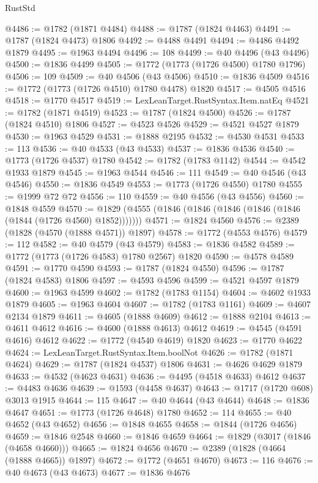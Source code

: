 \begin{lexlean}{RustStd}
\begin{coremodule}
@4486 := @1782 (@1871 @4484)
@4488 := @1787 (@1824 @4463)
@4491 := @1787 (@1824 @4473) @1806
@4492 := @4488 @4491
@4494 := @4486 @4492 @1879
@4495 := @1963 @4494
@4496 := 108
@4499 := @40 @4496 (@43 @4496)
@4500 := @1836 @4499
@4505 := @1772 (@1773 (@1726 @4500) @1780 @1796)
@4506 := 109
@4509 := @40 @4506 (@43 @4506)
@4510 := @1836 @4509
@4516 := @1772 (@1773 (@1726 @4510) @1780 @4478) @1820
@4517 := @4505 @4516
@4518 := @1770 @4517
@4519 := LexLeanTarget.RustSyntax.Item.natEq
@4521 := @1782 (@1871 @4519)
@4523 := @1787 (@1824 @4500)
@4526 := @1787 (@1824 @4510) @1806
@4527 := @4523 @4526
@4529 := @4521 @4527 @1879
@4530 := @1963 @4529
@4531 := @1888 @2195
@4532 := @4530 @4531
@4533 := 113
@4536 := @40 @4533 (@43 @4533)
@4537 := @1836 @4536
@4540 := @1773 (@1726 @4537) @1780
@4542 := @1782 (@1783 @1142)
@4544 := @4542 @1933 @1879
@4545 := @1963 @4544
@4546 := 111
@4549 := @40 @4546 (@43 @4546)
@4550 := @1836 @4549
@4553 := @1773 (@1726 @4550) @1780
@4555 := @1999 @72 @72
@4556 := 110
@4559 := @40 @4556 (@43 @4556)
@4560 := @1848 @4559
@4570 := @1829 (@4555 (@1846 (@1846 (@1846 (@1846 (@1846 (@1844 (@1726 @4560) @1852)))))))
@4571 := @1824 @4560
@4576 := @2389 (@1828 (@4570 (@1888 @4571)) @1897)
@4578 := @1772 (@4553 @4576)
@4579 := 112
@4582 := @40 @4579 (@43 @4579)
@4583 := @1836 @4582
@4589 := @1772 (@1773 (@1726 @4583) @1780 @2567) @1820
@4590 := @4578 @4589
@4591 := @1770 @4590
@4593 := @1787 (@1824 @4550)
@4596 := @1787 (@1824 @4583) @1806
@4597 := @4593 @4596
@4599 := @4521 @4597 @1879
@4600 := @1963 @4599
@4602 := @1782 (@1783 @1154)
@4604 := @4602 @1933 @1879
@4605 := @1963 @4604
@4607 := @1782 (@1783 @1161)
@4609 := @4607 @2134 @1879
@4611 := @4605 (@1888 @4609)
@4612 := @1888 @2104
@4613 := @4611 @4612
@4616 := @4600 (@1888 @4613) @4612
@4619 := @4545 (@4591 @4616) @4612
@4622 := @1772 (@4540 @4619) @1820
@4623 := @1770 @4622
@4624 := LexLeanTarget.RustSyntax.Item.boolNot
@4626 := @1782 (@1871 @4624)
@4629 := @1787 (@1824 @4537) @1806
@4631 := @4626 @4629 @1879
@4633 := @4532 (@4623 @4631)
@4636 := @4495 (@4518 @4633) @4612
@4637 := @4483 @4636
@4639 := @1593 (@4458 @4637)
@4643 := @1717 (@1720 @608) @3013 @1915
@4644 := 115
@4647 := @40 @4644 (@43 @4644)
@4648 := @1836 @4647
@4651 := @1773 (@1726 @4648) @1780
@4652 := 114
@4655 := @40 @4652 (@43 @4652)
@4656 := @1848 @4655
@4658 := @1844 (@1726 @4656)
@4659 := @1846 @2548
@4660 := @1846 @4659
@4664 := @1829 (@3017 (@1846 (@4658 @4660)))
@4665 := @1824 @4656
@4670 := @2389 (@1828 (@4664 (@1888 @4665)) @1897)
@4672 := @1772 (@4651 @4670)
@4673 := 116
@4676 := @40 @4673 (@43 @4673)
@4677 := @1836 @4676

\end{coremodule}
\end{lexlean}
